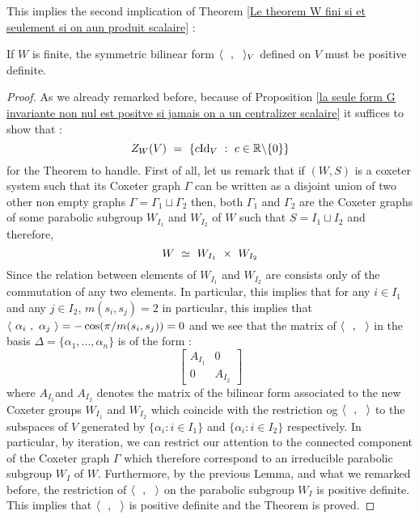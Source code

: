 This implies the second implication of Theorem \ref{Le theorem W fini si et seulement si on  aun produit scalaire} :
\begin{theorem}
	If $W$ is finite, the symmetric bilinear form  $\langle\text{ } \text{ },\text{ }\text{ }\rangle_V$ defined on $V$ must be positive definite.
\end{theorem}
\begin{proof}
	As we already remarked before, because of Proposition \ref{la seule form G invariante non nul est positve si jamais on a un centralizer scalaire} it suffices to show that :
	\begin{equation}
	Z_W(V)\text{ }=\text{ }\{c\mbox{Id}_V\text{ }:\text{ } c\in \mathbb R\backslash\{0\}\}
	\end{equation}
	for the Theorem to handle. First of all, let us remark that if $(W,S)$ is a coxeter system such that its Coxeter graph $\Gamma$ can be written as a disjoint union of two other non empty graphs $\Gamma=\Gamma_1\sqcup \Gamma_2$ then, both $\Gamma_1$ and $\Gamma_2$ are the Coxeter graphs of some parabolic subgroup $W_{I_1}$ and $W_{I_2}$ of $W$ such that $S=I_1\sqcup I_2$ and therefore,
	\begin{equation}
	W\text{ }\simeq\text{ } W_{I_1}\text{ } \times \text{ } W_{I_2}
	\end{equation}
	Since the relation between elements of  $W_{I_1}$ and $W_{I_2}$ are consists only of the commutation of any two elements. In particular, this implies that for any $i\in I_1$ and any $j\in I_2$, $m(s_i,s_j)=2$ in particular, this implies that $\langle\text{ } \alpha_i\text{ },\text{ }\alpha_j\text{ }\rangle=-\cos(\pi/m(s_i,s_j))=0$ and we see that the matrix of $\langle\text{ } \text{ },\text{ }\text{ }\rangle$ in the basis $\Delta=\{\alpha_1,...,\alpha_n\}$ is of the form :
	\begin{equation}
	\begin{bmatrix}
	A_{I_1} & 0\\
	0 & A_{I_2}
	\end{bmatrix}
	\end{equation}
	where $A_{I_1}$and $A_{I_2}$ denotes the matrix of the bilinear form associated to the new Coxeter groups $W_{I_1}$ and $W_{I_2}$ which coincide with the restriction og $\langle\text{ } \text{ },\text{ }\text{ }\rangle$ to the subspaces of $V$ generated by $\{\alpha_i:i\in I_1\}$ and $\{\alpha_i:i\in I_2\}$ respectively. In particular, by iteration, we can restrict our attention to the connected component of the Coxeter graph $\Gamma$ which therefore correspond to an irreducible parabolic subgroup $W_I$ of $W$. Furthermore, by the previous Lemma, and what we remarked before, the restriction of $\langle\text{ } \text{ },\text{ }\text{ }\rangle$ on the parabolic subgroup $W_I$ is positive definite. This implies that $\langle\text{ } \text{ },\text{ }\text{ }\rangle$ is positive definite and the Theorem is proved.
\end{proof}
